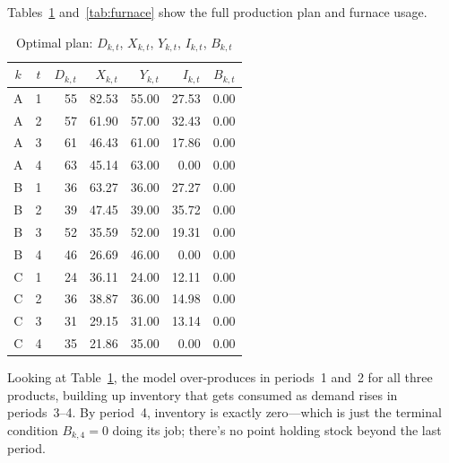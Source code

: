 \documentclass[11pt,a4paper]{article}
\begin{document}
Tables~\ref{tab:production} and~\ref{tab:furnace} show the full production
plan and furnace usage.

\begin{table}[H]
  \centering
  \caption{Optimal plan: $D_{k,t}$, $X_{k,t}$, $Y_{k,t}$, $I_{k,t}$, $B_{k,t}$}
  \label{tab:production}
  \small
  \begin{tabular}{ccrrrrr}
    \toprule
    $k$ & $t$ & $D_{k,t}$ & $X_{k,t}$ & $Y_{k,t}$ & $I_{k,t}$ & $B_{k,t}$ \\
    \midrule
    A   & 1   & 55        & 82.53     & 55.00     & 27.53     & 0.00      \\
    A   & 2   & 57        & 61.90     & 57.00     & 32.43     & 0.00      \\
    A   & 3   & 61        & 46.43     & 61.00     & 17.86     & 0.00      \\
    A   & 4   & 63        & 45.14     & 63.00     & 0.00      & 0.00      \\
    \midrule
    B   & 1   & 36        & 63.27     & 36.00     & 27.27     & 0.00      \\
    B   & 2   & 39        & 47.45     & 39.00     & 35.72     & 0.00      \\
    B   & 3   & 52        & 35.59     & 52.00     & 19.31     & 0.00      \\
    B   & 4   & 46        & 26.69     & 46.00     & 0.00      & 0.00      \\
    \midrule
    C   & 1   & 24        & 36.11     & 24.00     & 12.11     & 0.00      \\
    C   & 2   & 36        & 38.87     & 36.00     & 14.98     & 0.00      \\
    C   & 3   & 31        & 29.15     & 31.00     & 13.14     & 0.00      \\
    C   & 4   & 35        & 21.86     & 35.00     & 0.00      & 0.00      \\
    \bottomrule
  \end{tabular}
\end{table}

Looking at Table~\ref{tab:production}, the model over-produces in periods~1
and~2 for all three products, building up inventory that gets consumed as
demand rises in periods~3--4. By period~4, inventory is exactly zero---which
is just the terminal condition $B_{k,4}=0$ doing its job; there's no point
holding stock beyond the last period.
\end{document}
